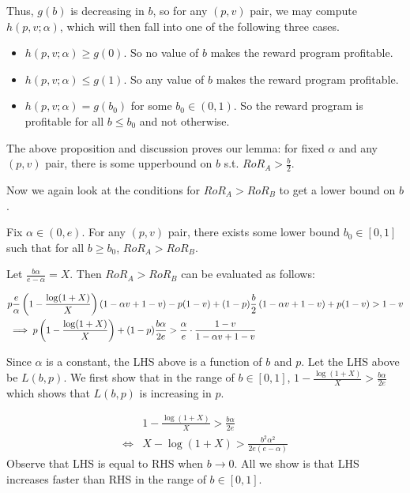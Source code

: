 \endproof

Thus, $g(b)$ is decreasing in $b$, so for any $(p,v)$ pair, we may compute $h(p, v; \alpha)$, which will then fall into one of the following three cases.
\begin{itemize}
\item
$h(p,v;\alpha) \geq g(0)$. So no value of $b$ makes the reward program profitable.
\item
$h(p,v;\alpha) \leq g(1)$. So any value of $b$ makes the reward program profitable.
\item
$h(p,v;\alpha) = g(b_0)$ for some $b_0 \in (0,1)$. So the reward program is profitable for all $b \leq b_0$ and not otherwise.
\end{itemize}

The above proposition and discussion proves our lemma: for fixed $\alpha$ and any $(p,v)$ pair, there is some upperbound on $b$ s.t. $RoR_A > \frac{b}{2}$. 
\endproof

Now we again look at the conditions for $RoR_A > RoR_B$ to get a lower bound on $b$.  
\begin{lemma}
Fix $\alpha \in (0, e)$. For any $(p,v)$ pair, there exists some lower bound $b_0 \in [0,1]$ such that for all $b \geq b_0$, $RoR_A > RoR_B$.
\end{lemma}

\proof
Let $\frac{b\alpha}{e-\alpha} = X$. Then $RoR_A > RoR_B$ can be evaluated as follows:

\begin{eqnarray}
& p\frac{e}{\alpha}\left(1-\frac{\log(1+X)}{X}\right)(1-\alpha v + 1 - v) - p(1-v) + (1-p)\frac{b}{2}\left(1-\alpha v + 1-v\right) + p(1-v) > 1-v\notag\\
& \implies p\left(1 - \frac{\log(1+X)}{X}\right) + (1-p)\frac{b\alpha}{2e} > \frac{\alpha}{e} \cdot \frac{1-v}{1-\alpha v + 1 - v}\label{eq:ra>rb}
\end{eqnarray}

Since $\alpha$ is a constant, the LHS above is a function of $b$ and $p$. 
Let the LHS above be $L(b,p)$.
We first show that in the range of $b\in [0,1]$, $1 - \frac{\log(1+X)}{X} > \frac{b\alpha}{2e}$ which shows that $L(b,p)$ is increasing in $p$.

\begin{align*}
& 1-\frac{\log(1+X)}{X} > \frac{b\alpha}{2e}\\
\Leftrightarrow & X - \log(1+X) > \frac{b^2\alpha^2}{2e(e-\alpha)}
\end{align*}
Observe that LHS is equal to RHS when $b\rightarrow 0$. 
All we show is that LHS increases faster than RHS in the range of $b\in [0,1]$. 

